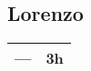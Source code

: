 \subsection*{Lorenzo}
\begin{table}[H]
    \begin{tabular}{lr}
        \toprule
        \textbf{---} & \textbf{3h} \\
        \bottomrule
    \end{tabular}
\end{table}
